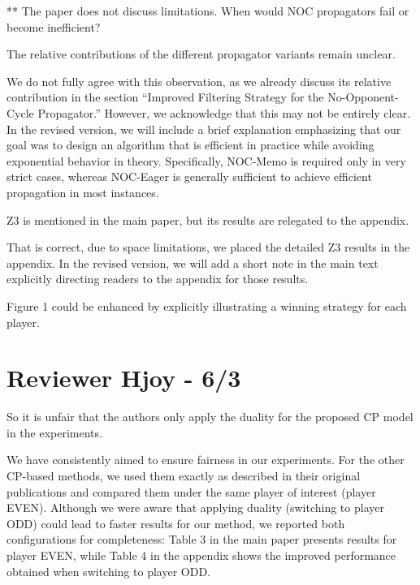 \documentclass{article}
\begin{document}
\begin{reviewer}
** The paper does not discuss limitations. When would NOC propagators fail or become inefficient?
\end{reviewer}

\begin{reviewer}
The relative contributions of the different propagator variants remain unclear.
\end{reviewer}

We do not fully agree with this observation, as we already discuss its relative contribution in the section “Improved Filtering Strategy for the No-Opponent-Cycle Propagator.” However, we acknowledge that this may not be entirely clear. In the revised version, we will include a brief explanation emphasizing that our goal was to design an algorithm that is efficient in practice while avoiding exponential behavior in theory. Specifically, NOC-Memo is required only in very strict cases, whereas NOC-Eager is generally sufficient to achieve efficient propagation in most instances.

\begin{reviewer}
Z3 is mentioned in the main paper, but its results are relegated to the appendix.
\end{reviewer}

That is correct, due to space limitations, we placed the detailed Z3 results in the appendix. In the revised version, we will add a short note in the main text explicitly directing readers to the appendix for those results.

\begin{reviewer}
Figure 1 could be enhanced by explicitly illustrating a winning strategy for each player.
\end{reviewer}


\section{Reviewer Hjoy - 6/3}

\begin{reviewer}
So it is unfair that the authors only apply the duality for the proposed CP model in the experiments.
\end{reviewer}

We have consistently aimed to ensure fairness in our experiments.
For the other CP-based methods, we used them exactly as described in their original publications and compared them under the same player of interest (player EVEN). Although we were aware that applying duality (switching to player ODD) could lead to faster results for our method, we reported both configurations for completeness: Table 3 in the main paper presents results for player EVEN, while Table 4 in the appendix shows the improved performance obtained when switching to player ODD.
\end{document}
